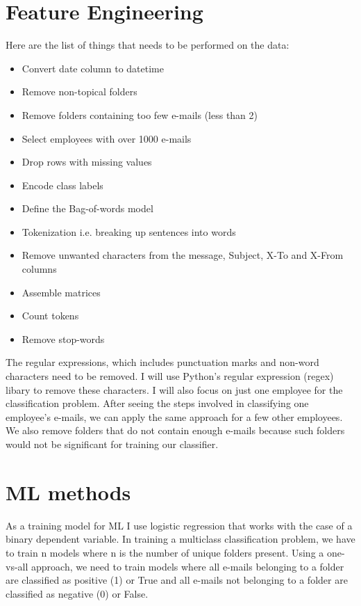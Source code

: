 \documentclass[11pt,fleqn]{book} %
\begin{document}
\section{Feature Engineering}
Here are the list of things that needs to be performed on the data:
\begin{itemize}
\item Convert date column to datetime
\item Remove non-topical folders
\item Remove folders containing too few e-mails (less than 2)
\item Select employees with over 1000 e-mails
\item Drop rows with missing values
\item Encode class labels
\item Define the Bag-of-words model
\item Tokenization i.e. breaking up sentences into words 
\item Remove unwanted characters from the message, Subject, X-To and X-From columns
\item Assemble matrices
\item Count tokens
\item Remove stop-words
\end{itemize}

The regular expressions, which includes punctuation marks and non-word characters need to be removed. I will use Python's regular expression (regex) libary to remove these characters. I will also focus on just one employee for the classification problem. After seeing the steps involved in classifying one employee's e-mails, we can apply the same approach for a few other employees. We also remove folders that do not contain enough e-mails because such folders would not be significant for training our classifier.

\section{ML methods}
As a training model for ML I use logistic regression that works with the case of a binary dependent variable. In training a multiclass classification problem, we have to train n models where n is the number of unique folders present. Using a one-vs-all approach, we need to train models where all e-mails belonging to a folder are classified as positive (1) or True and all e-mails not belonging to a folder are classified as negative (0) or False.
\end{document}
